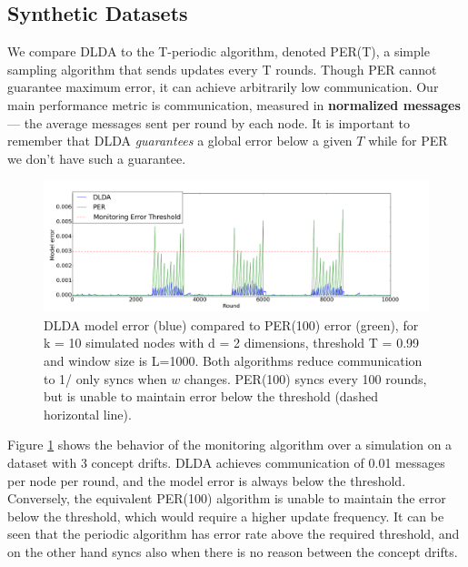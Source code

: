 \documentclass[11pt,twocolumn,varwidth=true,a4paper,fleqn]{article}
\begin{document}
\subsection{Synthetic Datasets}
We compare DLDA to the T-periodic algorithm, denoted
PER(T), a simple sampling algorithm that sends updates
every T rounds. Though PER cannot guarantee maximum
error, it can achieve arbitrarily low communication.
Our main performance metric is communication, measured
in \textbf{normalized messages} --- the average messages sent per
round by each node. It is important to remember that DLDA \textit{guarantees}
a global error below a given $T$ while for PER we don't have such a guarantee.

\begin{figure}[ht]
	\centering
	\includegraphics[width=\textwidth]{PER/PERvsDLDAoverTime.png}
	\caption{ DLDA model error (blue) compared to PER(100) error (green), 
	for k = 10 simulated nodes with d = 2 dimensions, threshold T = 0.99 and
	window size is L=1000. 	Both algorithms reduce communication to 1/%
	only syncs when $w$ changes. PER(100) syncs every 100 rounds, 
	but is unable to maintain error below the threshold (dashed horizontal line).}
	\label{PERvsDLDAoverTime}
\end{figure}
	
Figure \ref{PERvsDLDAoverTime} shows the behavior of the monitoring algorithm
over a simulation on a dataset with 3 concept drifts. DLDA achieves
communication of 0.01 messages per node per round, and the model error is always below the threshold. Conversely, the
equivalent PER(100) algorithm is unable to maintain the
error below the threshold, which would require a higher update
frequency.  It can be seen that the periodic algorithm has error rate above the
required threshold, and on the other hand syncs also when there is no reason
between the concept drifts.
\end{document}
